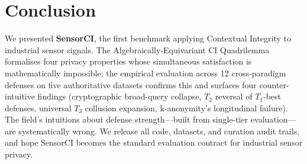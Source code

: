 \documentclass{article}
\theoremstyle{remark}
\begin{document}
\section{Conclusion}
\label{sec:conclusion}

We presented \textbf{SensorCI}, the first benchmark applying Contextual Integrity to industrial sensor signals. The Algebraically-Equivariant CI Quadrilemma formalises four privacy properties whose simultaneous satisfaction is mathematically impossible; the empirical evaluation across 12 cross-paradigm defenses on five authoritative datasets confirms this and surfaces four counter-intuitive findings (cryptographic broad-query collapse, $T_2$ reversal of $T_1$-best defenses, universal $T_3$ collusion expansion, k-anonymity's longitudinal failure). The field's intuitions about defense strength---built from single-tier evaluation---are systematically wrong. We release all code, datasets, and curation audit trails, and hope SensorCI becomes the standard evaluation contract for industrial sensor privacy.
\end{document}
